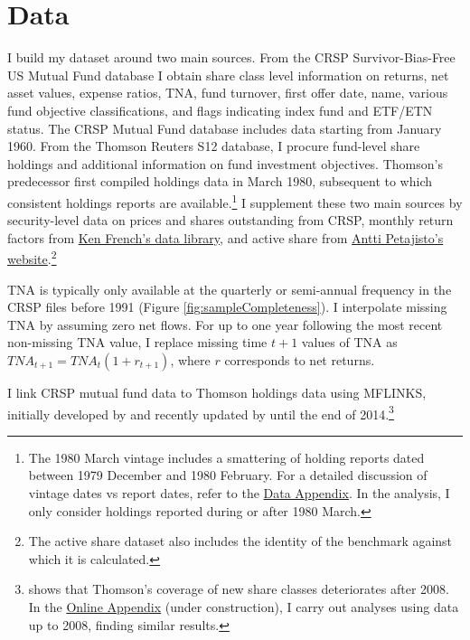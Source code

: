 \documentclass[openany]{book}
\let\rmarkdownfootnote\footnote%
\def\footnote{\protect\rmarkdownfootnote}
\theoremstyle{definition}
\theoremstyle{definition}
\theoremstyle{definition}
\theoremstyle{remark}
\begin{document}
\chapter{Data}\label{sec:Data}

I build my dataset around two main sources. From the CRSP
Survivor-Bias-Free US Mutual Fund database I obtain share class level
information on returns, net asset values, expense ratios, TNA, fund
turnover, first offer date, name, various fund objective
classifications, and flags indicating index fund and ETF/ETN status. The
CRSP Mutual Fund database includes data starting from January 1960. From
the Thomson Reuters S12 database, I procure fund-level share holdings
and additional information on fund investment objectives. Thomson's
predecessor first compiled holdings data in March 1980, subsequent to
which consistent holdings reports are available.\footnote{The 1980 March
  vintage includes a smattering of holding reports dated between 1979
  December and 1980 February. For a detailed discussion of vintage dates
  vs report dates, refer to the
  \href{https://www.dropbox.com/s/qugvhb8b0wqp0cg/LJ_JMP_Data_Appendix.pdf?dl=0}{Data
  Appendix}. In the analysis, I only consider holdings reported during
  or after 1980 March.} I supplement these two main sources by
security-level data on prices and shares outstanding from CRSP, monthly
return factors from
\href{http://mba.tuck.dartmouth.edu/pages/faculty/ken.french/data_library.html}{Ken
French's data library}, and active share \citep{cp09, petajisto13} from
\href{http://www.petajisto.net/data.html}{Antti Petajisto's
website}.\footnote{The active share dataset also includes the identity
  of the benchmark against which it is calculated.}

TNA is typically only available at the quarterly or semi-annual
frequency in the CRSP files before 1991 (Figure
\ref{fig:sampleCompleteness}). I interpolate missing TNA by assuming
zero net flows. For up to one year following the most recent non-missing
TNA value, I replace missing time \(t+1\) values of TNA as
\(TNA_{t+1}=TNA_t(1+r_{t+1})\), where \(r\) corresponds to net returns.

I link CRSP mutual fund data to Thomson holdings data using MFLINKS,
initially developed by \citet{wermers00} and recently updated by
\citet{cx15} until the end of 2014.\footnote{\citet{zhu17} shows that
  Thomson's coverage of new share classes deteriorates after 2008. In
  the
  \href{https://www.dropbox.com/s/k7dygbn5slyrybc/Online_Appendix.pdf?dl=0}{Online
  Appendix} (under construction), I carry out analyses using data up to
  2008, finding similar results.}
\end{document}
